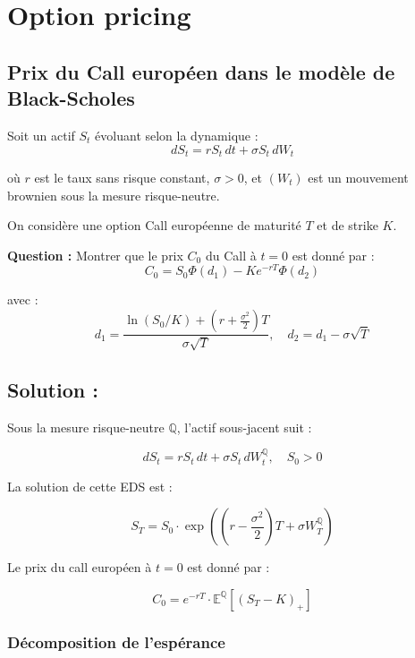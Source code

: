 \chapter{Option pricing}

\section{Prix du Call européen dans le modèle de Black-Scholes}

\begin{exerciseBox}
Soit un actif \( S_t \) évoluant selon la dynamique :
\[
dS_t = r S_t\, dt + \sigma S_t\, dW_t
\]

où \( r \) est le taux sans risque constant, \( \sigma > 0 \), et \( (W_t) \) est un mouvement brownien sous la mesure risque-neutre.

\vspace{1cm}

On considère une option Call européenne de maturité \( T \) et de strike \( K \). 

\vspace{1cm}

\textbf{Question :} Montrer que le prix \( C_0 \) du Call à \( t=0 \) est donné par :
\[
C_0 = S_0 \Phi(d_1) - K e^{-rT} \Phi(d_2)
\]

avec :
\[
d_1 = \frac{\ln(S_0/K) + (r + \frac{\sigma^2}{2})T}{\sigma \sqrt{T}}, 
\quad 
d_2 = d_1 - \sigma \sqrt{T}
\]
\end{exerciseBox}


\section*{Solution :}

Sous la mesure risque-neutre \( \mathbb{Q} \), l’actif sous-jacent suit :

\[
dS_t = r S_t\, dt + \sigma S_t\, dW_t^{\mathbb{Q}}, \quad S_0 > 0
\]

La solution de cette EDS est :

\[
S_T = S_0 \cdot \exp\left( \left(r - \frac{\sigma^2}{2}\right)T + \sigma W_T^{\mathbb{Q}} \right)
\]

Le prix du call européen à \( t = 0 \) est donné par :

\[
C_0 = e^{-rT} \cdot \mathbb{E}^{\mathbb{Q}}\left[ (S_T - K)_+ \right]
\]


\subsection*{Décomposition de l’espérance}

